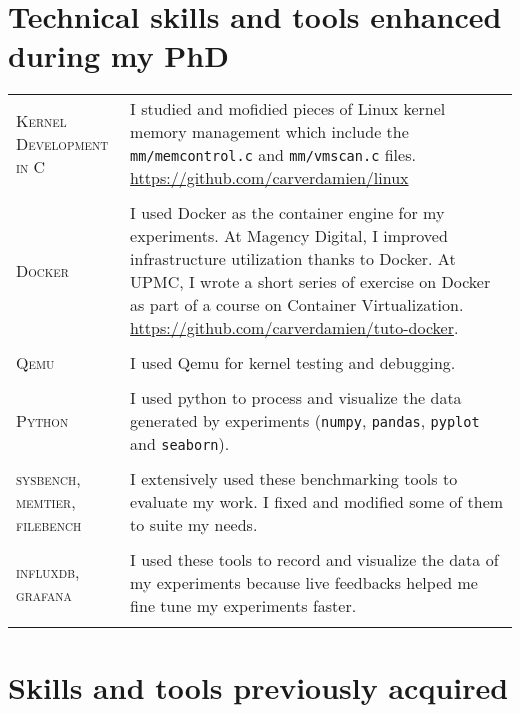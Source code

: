 \section{Technical skills and tools enhanced during my PhD}

\begin{tabular}{p{2cm}|p{11cm}}

\textsc{Kernel \newline Development in C} & I studied and mofidied pieces of Linux kernel memory management which include the \texttt{mm/memcontrol.c} and \texttt{mm/vmscan.c} files. \href{https://github.com/carverdamien/linux}{https://github.com/carverdamien/linux}\\
\multicolumn{2}{c}{} \\

\textsc{Docker} & I used Docker as the container engine for my experiments. At Magency Digital, I improved infrastructure utilization thanks to Docker. At UPMC, I wrote a short series of exercise on Docker as part of a course on Container Virtualization. \href{https://github.com/carverdamien/tuto-docker}{https://github.com/carverdamien/tuto-docker}.\\
\multicolumn{2}{c}{} \\

\textsc{Qemu} & I used Qemu for kernel testing and debugging.\\
\multicolumn{2}{c}{} \\

\textsc{Python} & I used python to process and visualize the data generated by experiments (\texttt{numpy}, \texttt{pandas}, \texttt{pyplot} and \texttt{seaborn}).\\
\multicolumn{2}{c}{} \\

\textsc{sysbench, memtier, filebench} &  I extensively used these benchmarking tools to evaluate my work. I fixed and modified some of them to suite my needs.\\
\multicolumn{2}{c}{} \\

\textsc{influxdb, grafana} & I used these tools to record and visualize the data of my experiments because live feedbacks helped me fine tune my experiments faster.\\
\multicolumn{2}{c}{} \\

\end{tabular}

\section{Skills and tools previously acquired}


